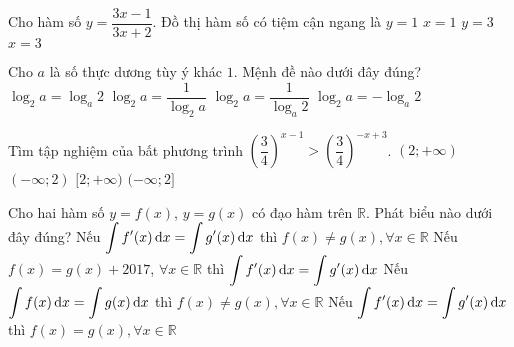 \begin{ex}%
Cho hàm số $y=\dfrac{3x-1}{3x+2}$. Đồ thị hàm số có tiệm cận ngang là
\choice
{\True $y=1$}
{$x=1$}
{$y=3$}
{$x=3$}
\end{ex}

\begin{ex}%
Cho $a$ là số thực dương tùy ý khác $1$. Mệnh đề nào dưới đây đúng?
\choice
{$\log_{2}a=\log_{a}2$}
{$\log_{2}a=\dfrac{1}{\log_{2}a}$}
{\True $\log_{2}a=\dfrac{1}{\log_{a}2}$}
{$\log_{2}a=-\log_{a}2$}
\end{ex}

\begin{ex}%
Tìm tập nghiệm của bất phương trình $\left(\dfrac{3}{4}\right)^{x-1}>\left(\dfrac{3}{4}\right)^{-x+3}$.
\choice
{$(2;+\infty)$}
{\True $(-\infty;2)$}
{$[2;+\infty)$}
{$(-\infty;2]$}
\end{ex}

\begin{ex}%
Cho hai hàm số $y=f(x)$, $y=g(x)$ có đạo hàm trên $\mathbb{R}$. Phát biểu nào dưới đây đúng?
\choice
{Nếu $\displaystyle\int f'(x)\textrm{\,d}x=\displaystyle\int g'(x)\textrm{\,d}x$ thì $f(x)\ne g(x), \forall x\in\mathbb{R}$}
{\True Nếu $f(x)=g(x)+2017$, $\forall x\in\mathbb{R}$ thì $\displaystyle\int f'(x)\textrm{\,d}x=\displaystyle\int g'(x)\textrm{\,d}x$}
{Nếu $\displaystyle\int f(x)\textrm{\,d}x=\displaystyle\int g(x)\textrm{\,d}x$ thì $f(x)\ne g(x), \forall x\in\mathbb{R}$}
{Nếu $\displaystyle\int f'(x)\textrm{\,d}x=\displaystyle\int g'(x)\textrm{\,d}x$ thì $f(x)=g(x), \forall x\in\mathbb{R}$}
\end{ex}

